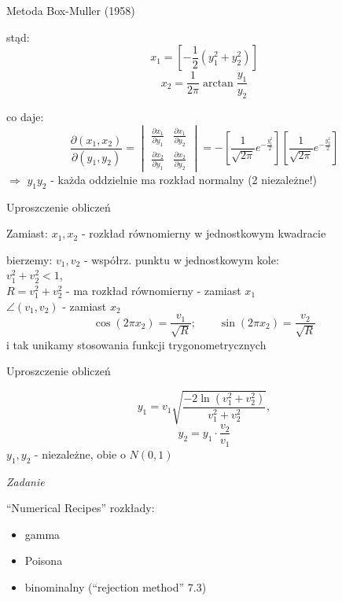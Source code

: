 \begin{frame}{Metoda Box-Muller (1958)}
	\begin{block}{stąd:}
		\[
			x_{1} = \left[- \frac{1}{2} (y_{1}^{2} + y_{2}^{2})\right]
		\]
		\[
			x_{2} = \frac{1}{2\pi} \arctan\frac{y_{1}}{y_{2}}
		\]
	\end{block}
	
	\begin{block}{co daje:}
		\[
			\frac{\partial(x_{1}, x_{2})}{\partial(y_{1}, y_{2})} = \begin{vmatrix}
				\frac{\partial x_{1}}{\partial y_{1}} & \frac{\partial x_{1}}{\partial y_{2}} \\
				\frac{\partial x_{2}}{\partial y_{1}} & \frac{\partial x_{2}}{\partial y_{2}}
			\end{vmatrix} =
			- \left[\frac{1}{\sqrt{2\pi}} e^{-\frac{y_{1}^{2}}{2}}\right] \left[\frac{1}{\sqrt{2\pi}} e^{-\frac{y_{2}^{2}}{2}}\right]
		\]
		$\Rightarrow$ $y_{1} y_{2}$ - każda oddzielnie ma rozkład normalny (2 niezależne!)
	\end{block}
\end{frame}
\begin{frame}{Uproszczenie obliczeń}
	\begin{block}{Zamiast:}
		$x_{1}, x_{2}$ - rozkład równomierny w jednostkowym kwadracie
	\end{block}

	\begin{block}{bierzemy:}
		$v_{1}, v_{2}$ - współrz. punktu w jednostkowym kole:\\
		$v_{1}^{2} + v_{2}^{2} < 1$,\\
		$R = v_{1}^{2} + v_{2}^{2}$ - ma rozkład równomierny - zamiast $x_{1}$\\
		$\angle(v_{1}, v_{2})$ - zamiast $x_{2}$
		\[
			\cos(2\pi x_{2}) = \frac{v_{1}}{\sqrt{R}}; \qquad \sin(2\pi x_{2}) = \frac{v_{2}}{\sqrt{R}}
		\]
		i tak unikamy stosowania funkcji trygonometrycznych
	\end{block}
\end{frame}
\begin{frame}{Uproszczenie obliczeń}
	\begin{block}{}
		\[
			y_{1} = v_{1}\sqrt{\frac{-2 \ln(v_{1}^{2} + v_{2}^{2})}{v_{1}^{2} + v_{2}^{2}}},
		\]
		\[
			y_{2} = y_{1} \cdot \frac{v_{2}}{v_{1}}
		\]
		$y_{1}, y_{2}$ - niezależne, obie o $N(0,1)$
	\end{block}

	\vspace{0.5cm}
	\begin{flushright}
		\textit{Zadanie}
	\end{flushright}

	\vspace{-0.5cm}
	``Numerical Recipes'' rozkłady:
	\begin{itemize}
		\item gamma
		\item Poisona
		\item binominalny (``rejection method'' 7.3)
	\end{itemize}
\end{frame}